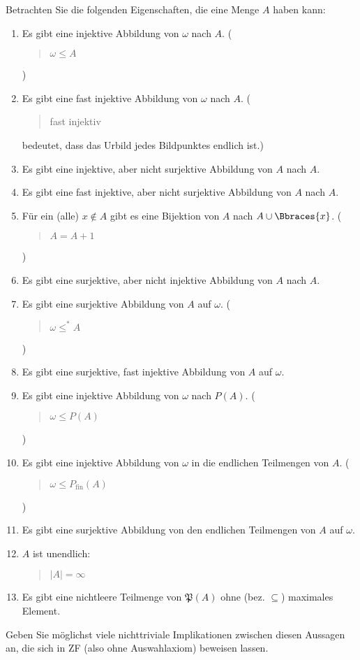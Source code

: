 
\begin{exercise}[272]

Betrachten Sie die folgenden Eigenschaften, die eine Menge $A$ haben kann:

\begin{enumerate}[label = \alph*.]
  \item Es gibt eine injektive Abbildung von $\omega$ nach $A$. (\blockquote{$\omega \leq A$})
  \item Es gibt eine fast injektive Abbildung von $\omega$ nach $A$.
  (\blockquote{fast injektiv} bedeutet, dass das Urbild jedes Bildpunktes endlich ist.)
  \item Es gibt eine injektive, aber nicht surjektive Abbildung von $A$ nach $A$.
  \item Es gibt eine fast injektive, aber nicht surjektive Abbildung von $A$ nach $A$.
  \item Für ein (alle) $x \notin A$ gibt es eine Bijektion von $A$ nach $A \cup \Bbraces{x}$.
  (\blockquote{$A = A + 1$})
  \item Es gibt eine surjektive, aber nicht injektive Abbildung von $A$ nach $A$.
  \item Es gibt eine surjektive Abbildung von $A$ auf $\omega$. (\blockquote{$\omega \leq^* A$})
  \item Es gibt eine surjektive, fast injektive Abbildung von $A$ auf $\omega$.
  \item Es gibt eine injektive Abbildung von $\omega$ nach $P(A)$. (\blockquote{$\omega \leq P(A)$})
  \item Es gibt eine injektive Abbildung von $\omega$ in die endlichen Teilmengen von $A$. (\blockquote{$\omega \leq P_\mathrm{fin}(A)$})
  \item Es gibt eine surjektive Abbildung von den endlichen Teilmengen von $A$ auf $\omega$.
  \item $A$ ist unendlich: \blockquote{$|A| = \infty$}
  \item Es gibt eine nichtleere Teilmenge von $\mathfrak{P}(A)$ ohne (bez. $\subseteq$) maximales Element.
\end{enumerate}

Geben Sie möglichst viele nichttriviale Implikationen zwischen diesen Aussagen an, die sich in ZF (also ohne Auswahlaxiom) beweisen lassen.

\end{exercise}

